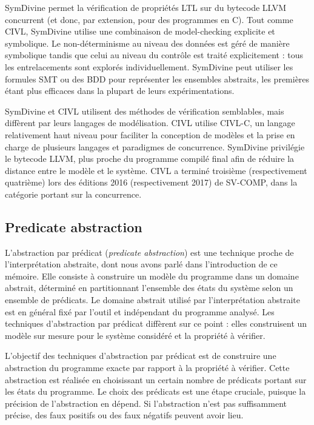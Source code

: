 SymDivine\cite{SymDivine} permet la vérification de propriétés \ac{LTL} sur du
bytecode LLVM concurrent (et donc, par extension, pour des programmes en C).
Tout comme CIVL, SymDivine utilise une combinaison de model-checking explicite
et symbolique. Le non-déterminisme au niveau des données est géré de manière
symbolique tandis que celui au niveau du contrôle est traité explicitement : tous
les entrelacements sont explorés individuellement. SymDivine peut utiliser les
formules SMT ou des BDD pour représenter les ensembles abstraits, les premières
étant plus efficaces dans la plupart de leurs expérimentations.

SymDivine et CIVL utilisent des méthodes de vérification semblables, mais
diffèrent par leurs langages de modélisation. CIVL utilise CIVL-C, un langage
relativement haut niveau pour faciliter la conception de modèles et la prise en
charge de plusieurs langages et paradigmes de concurrence. SymDivine
privilégie le bytecode LLVM, plus proche du programme compilé final afin de
réduire la distance entre le modèle et le système. CIVL a terminé troisième
(respectivement quatrième) lors des éditions 2016 (respectivement 2017) de
SV-COMP\cite{svcomp_2016_result, svcomp_2017_result}, dans la catégorie portant
sur la concurrence.

\subsection{Predicate abstraction}

L'abstraction par prédicat (\emph{predicate abstraction}) est une technique
proche de l'interprétation abstraite, dont nous avons parlé dans l'introduction
de ce mémoire. Elle consiste à construire un modèle du programme dans un
domaine abstrait, déterminé en partitionnant l'ensemble des états du système
selon un ensemble de prédicats. Le domaine abstrait utilisé par
l'interprétation abstraite est en général fixé par l'outil et
indépendant du programme analysé. Les techniques d'abstraction par prédicat
diffèrent sur ce point : elles construisent un modèle sur mesure pour le système
considéré et la propriété à vérifier\cite{abstract_state_graph, dsilva_survey_2008}.

L'objectif des techniques d'abstraction par prédicat est de construire une
abstraction du programme exacte par rapport à la propriété à vérifier. Cette
abstraction est réalisée en choisissant un certain nombre de prédicats portant
sur les états du programme. Le choix des prédicats est une étape cruciale,
puisque la précision de l'abstraction en dépend. Si l'abstraction n'est pas
suffisamment précise, des faux positifs ou des faux négatifs peuvent avoir lieu.

